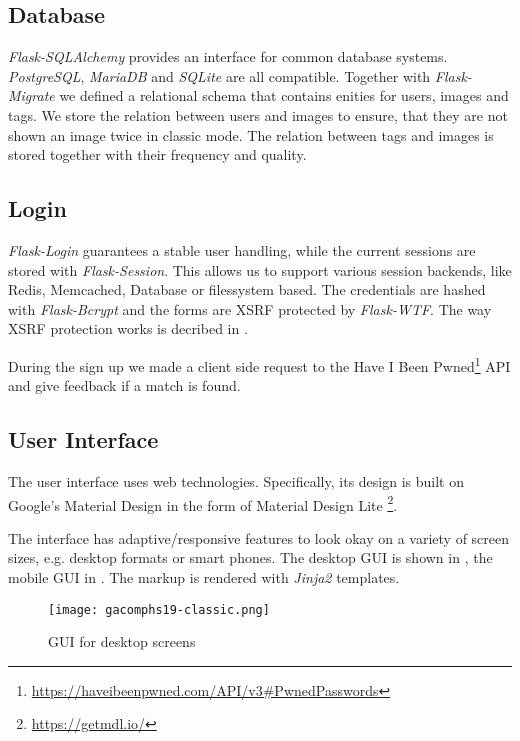 \subsection{Database}
\label{gacomphs19:sec:implementation:database}
\textit{Flask-SQLAlchemy} provides an interface for common database systems. \textit{PostgreSQL}, \textit{MariaDB} and \textit{SQLite} are all compatible.
Together with \textit{Flask-Migrate} we defined a relational schema that contains enities for users, images and tags. We store the relation between users and images to ensure, that they are not shown an image twice in classic mode. The relation between tags and images is stored together with their frequency and quality.

\subsection{Login}
\label{gacomphs19:sec:implementation:login}
\textit{Flask-Login} guarantees a stable user handling, while the current sessions are stored with \textit{Flask-Session}. This allows us to support various session backends, like Redis, Memcached, Database or filessystem based. The credentials are hashed with \textit{Flask-Bcrypt} and the forms are XSRF protected by \textit{Flask-WTF}. The way XSRF protection works is decribed in \cite{4198791}.

During the sign up we made a client side request to the Have I Been Pwned\footnote{\url{https://haveibeenpwned.com/API/v3\#PwnedPasswords}} API and give feedback if a match is found.

\subsection{User Interface}
\label{gacomphs19:sec:implementation:UI}

The user interface uses web technologies. Specifically, its design is built on Google's Material Design in the form of Material Design Lite \footnote{\url{https://getmdl.io/}}.

The interface has adaptive/responsive features to look okay on a variety of screen sizes, e.g. desktop formats or smart phones. The desktop GUI is shown in , the mobile GUI in .
The markup is rendered with \textit{Jinja2} templates.



\begin{figure}[!]
\centering
\texttt{[image: gacomphs19-classic.png]}
\caption{GUI for desktop screens}
\label{gacomphs19:fig:guiclassicdesktop}
\end{figure}


